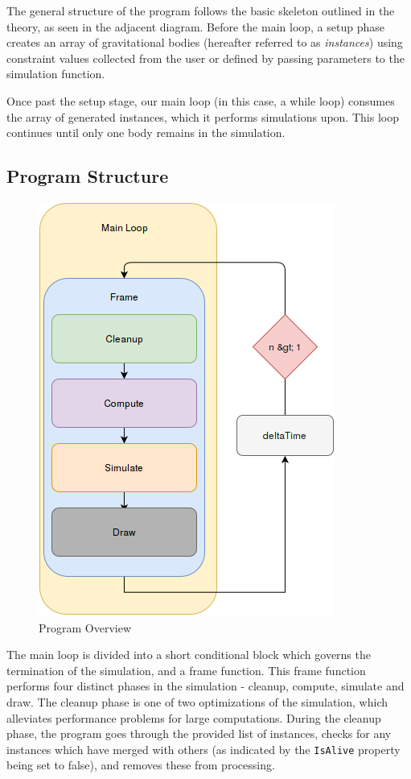 \documentclass[11pt]{article}
\begin{document}
The general structure of the program follows the basic skeleton outlined in the theory, as seen in the adjacent diagram. Before the main loop, a setup phase creates an array of gravitational bodies (hereafter referred to as \emph{instances}) using constraint values collected from the user or defined by passing parameters to the simulation function.

Once past the setup stage, our main loop (in this case, a while loop) consumes the array of generated instances, which it performs simulations upon. This loop continues until only one body remains in the simulation. 

\subsection{Program Structure}
\begin{figure}
	\vspace{-12pt}
	\begin{center}
    	\includegraphics[scale=0.40]{MainLoopDiagram}
    \end{center}
    \caption{Program Overview}
\end{figure}

The main loop is divided into a short conditional block which governs the termination of the simulation, and a frame function.
This frame function performs four distinct phases in the simulation - cleanup, compute, simulate and draw. The cleanup phase is one of two optimizations of the simulation, which alleviates performance problems for large computations. During the cleanup phase, the program goes through the provided list of instances, checks for any instances which have merged with others (as indicated by the \verb|IsAlive| property being set to false), and removes these from processing.
\end{document}
